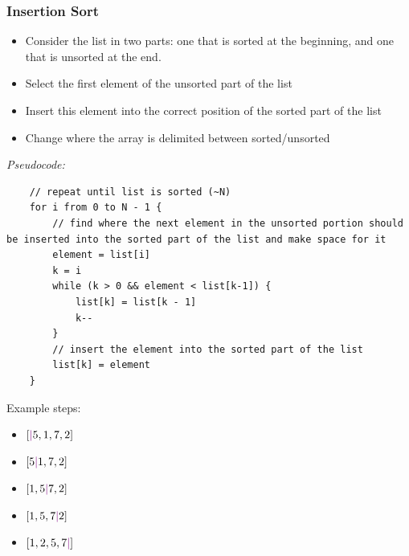 \documentclass[12pt]{article}
\begin{document}
\subsubsection{Insertion Sort}
\begin{itemize}
    \item Consider the list in two parts: one that is sorted at the beginning, and one that is unsorted at the end.
    \item Select the first element of the unsorted part of the list
    \item Insert this element into the correct position of the sorted part of the list
    \item Change where the array is delimited between sorted/unsorted
\end{itemize}

\textit{Pseudocode:}

\begin{verbatim}
    // repeat until list is sorted (~N)
    for i from 0 to N - 1 {
        // find where the next element in the unsorted portion should be inserted into the sorted part of the list and make space for it
        element = list[i]
        k = i
        while (k > 0 && element < list[k-1]) {
            list[k] = list[k - 1]
            k--
        }
        // insert the element into the sorted part of the list 
        list[k] = element
    }
\end{verbatim}

Example steps:

\begin{itemize}
    \item $[\textcolor{violet}{|}5,1,7,2]$
    \item $[5\textcolor{violet}{|}1,7,2]$
    \item $[1,5\textcolor{violet}{|}7,2]$
    \item $[1,5,7\textcolor{violet}{|}2]$
    \item $[1,2,5,7\textcolor{violet}{|}]$
\end{itemize}
\end{document}
